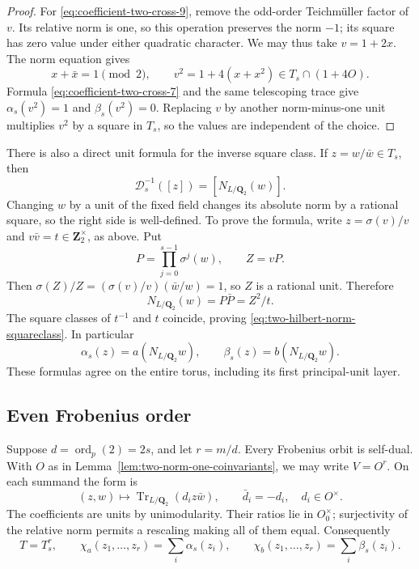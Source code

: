 \begin{proof}
For \eqref{eq:coefficient-two-cross-9}, remove the odd-order Teichm\"uller factor of
\(v\). Its relative norm is one, so this operation
preserves the norm \(-1\); its square has zero value
under either quadratic character. We may thus take
\(v=1+2x\). The norm equation gives
\[
                    x+\bar x=1\pmod2,
       \qquad v^2=1+4(x+x^2)\in T_s\cap(1+4O).
\]
Formula \eqref{eq:coefficient-two-cross-7} and the same telescoping trace give
\(\alpha_s(v^2)=1\) and \(\beta_s(v^2)=0\).
Replacing \(v\) by another norm-minus-one unit
multiplies \(v^2\) by a square in \(T_s\), so the
values are independent of the choice.
\end{proof}

There is also a direct unit formula for the inverse square class.
If \(z=w/\bar w\in T_s\), then
\begin{equation}\label{eq:two-hilbert-norm-squareclass}
 \mathcal D_s^{-1}([z])=[N_{L/\mathbf Q_2}(w)].
\end{equation}
Changing \(w\) by a unit of the fixed field changes its absolute
norm by a rational square, so the right side is well-defined.
To prove the formula, write \(z=\sigma(v)/v\) and
\(v\bar v=t\in\mathbf Z_2^\times\), as above. Put
\[
 P=\prod_{j=0}^{s-1}\sigma^j(w),\qquad Z=vP.
\]
Then \(\sigma(Z)/Z=(\sigma(v)/v)(\bar w/w)=1\), so
\(Z\) is a rational unit. Therefore
\[
 N_{L/\mathbf Q_2}(w)=P\bar P=Z^2/t.
\]
The square classes of \(t^{-1}\) and \(t\) coincide, proving
\eqref{eq:two-hilbert-norm-squareclass}. In particular
\[
 \alpha_s(z)=a(N_{L/\mathbf Q_2}w),\qquad
 \beta_s(z)=b(N_{L/\mathbf Q_2}w).
\]
These formulas agree on the entire torus, including its first
principal-unit layer.

\subsection{Even Frobenius order}

Suppose \(d=\operatorname{ord}_p(2)=2s\), and let
\(r=m/d\). Every Frobenius orbit is self-dual. With
\(O\) as in Lemma~\ref{lem:two-norm-one-coinvariants},
we may write \(V=O^r\). On each summand the form is
\[
       (z,w)\longmapsto
       \operatorname{Tr}_{L/\mathbf Q_2}(d_i z\bar w),
       \qquad \bar d_i=-d_i,\quad d_i\in O^\times.
\]
The coefficients are units by unimodularity. Their
ratios lie in \(O_0^\times\); surjectivity of the
relative norm permits a rescaling making all of
them equal. Consequently
\begin{equation}
 T=T_s^r,
 \qquad \chi_a(z_1,\ldots,z_r)=\sum_i\alpha_s(z_i),
 \qquad \chi_b(z_1,\ldots,z_r)=\sum_i\beta_s(z_i).
                                                        \label{eq:coefficient-two-cross-10}
\end{equation}

